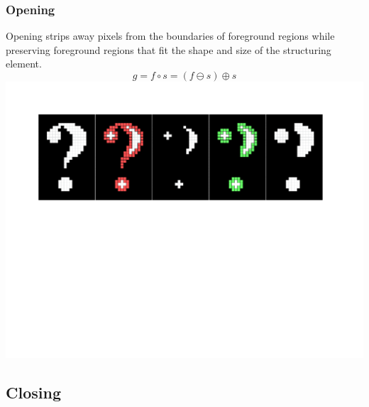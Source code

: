 \documentclass{beamer}
\begin{document}
\begin{frame}
\frametitle{Opening}
\begin{center}
Opening strips away pixels from the boundaries of foreground regions while preserving foreground regions that fit the shape and size of the structuring element.
\begin{equation*}
g = f \circ s = (f \ominus s) \oplus s
\end{equation*}
\includegraphics[width=1\textwidth,trim={0 0 0 0.5in},clip]{opening}
\end{center}
\end{frame}

\subsection[Closing]{Closing}
\end{document}
